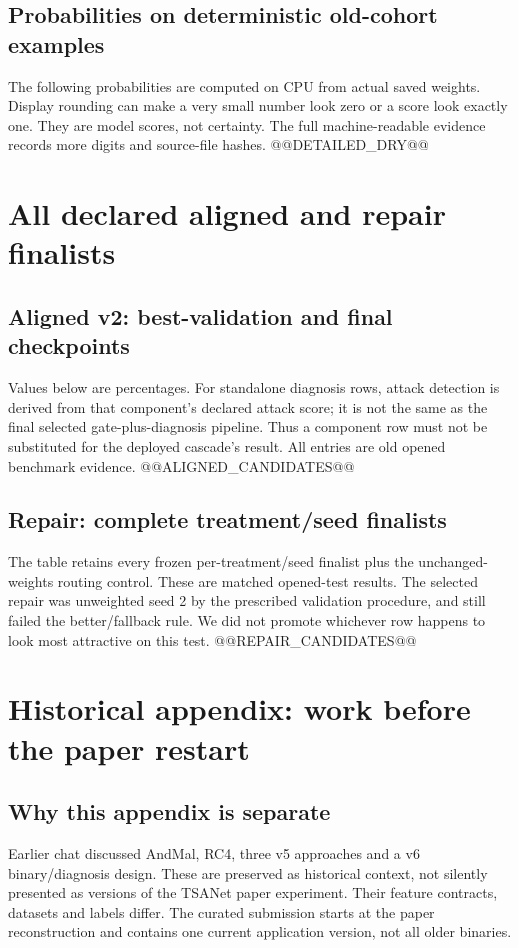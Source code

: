 \documentclass[11pt,a4paper,oneside]{report}
\begin{document}
\section{Probabilities on deterministic old-cohort examples}
The following probabilities are computed on CPU from actual saved weights. Display rounding can make a very small number look zero or a score look exactly one. They are model scores, not certainty. The full machine-readable evidence records more digits and source-file hashes.
@@DETAILED_DRY@@

\chapter{All declared aligned and repair finalists}
\section{Aligned v2: best-validation and final checkpoints}
Values below are percentages. For standalone diagnosis rows, attack detection is derived from that component's declared attack score; it is not the same as the final selected gate-plus-diagnosis pipeline. Thus a component row must not be substituted for the deployed cascade's result. All entries are old opened benchmark evidence.
@@ALIGNED_CANDIDATES@@

\section{Repair: complete treatment/seed finalists}
The table retains every frozen per-treatment/seed finalist plus the unchanged-weights routing control. These are matched opened-test results. The selected repair was unweighted seed 2 by the prescribed validation procedure, and still failed the better/fallback rule. We did not promote whichever row happens to look most attractive on this test.
@@REPAIR_CANDIDATES@@

\chapter{Historical appendix: work before the paper restart}
\section{Why this appendix is separate}
Earlier chat discussed AndMal, RC4, three v5 approaches and a v6 binary/diagnosis design. These are preserved as historical context, not silently presented as versions of the TSANet paper experiment. Their feature contracts, datasets and labels differ. The curated submission starts at the paper reconstruction and contains one current application version, not all older binaries.
\end{document}
